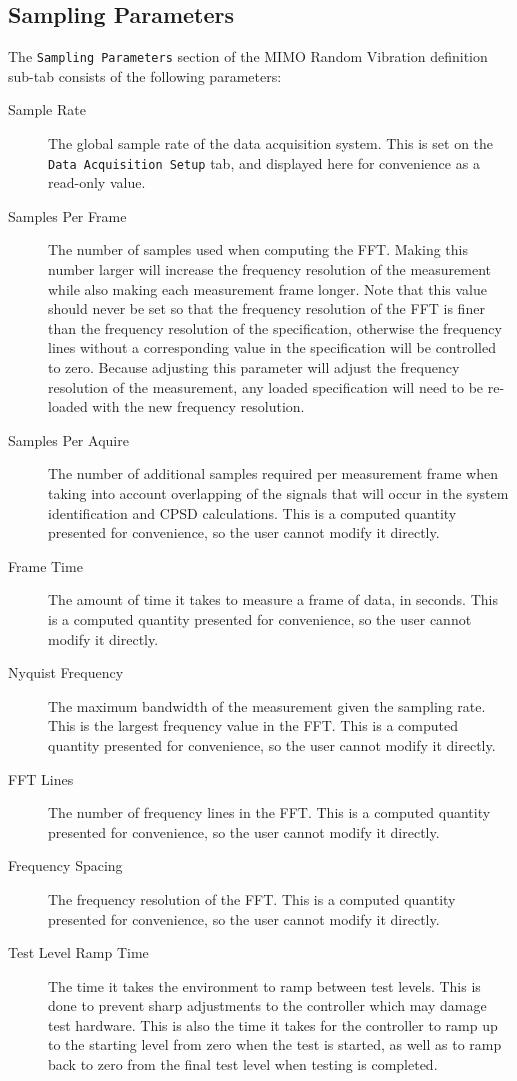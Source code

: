 \documentclass[pdf,12pt,report]{SANDreport}
\newcommand{\inlineCode}{\lstinline[basicstyle=\bfseries\ttfamily]}
\begin{document}
    \subsection{Sampling Parameters}
    The \inlineCode{Sampling Parameters} section of the \Ac{MIMO} Random Vibration definition sub-tab consists of the following parameters:
    \begin{description}
        \item[Sample Rate] The global sample rate of the data acquisition system.  This is set on the \inlineCode{Data Acquisition Setup} tab, and displayed here for convenience as a read-only value.
        \item[Samples Per Frame] The number of samples used when computing the \ac{FFT}.  Making this number larger will increase the frequency resolution of the measurement while also making each measurement frame longer.  Note that this value should never be set so that the frequency resolution of the \ac{FFT} is finer than the frequency resolution of the specification, otherwise the frequency lines without a corresponding value in the specification will be controlled to zero.  Because adjusting this parameter will adjust the frequency resolution of the measurement, any loaded specification will need to be re-loaded with the new frequency resolution.
        \item[Samples Per Aquire] The number of additional samples required per measurement frame when taking into account overlapping of the signals that will occur in the system identification and \ac{CPSD} calculations.  This is a computed quantity presented for convenience, so the user cannot modify it directly.
        \item[Frame Time] The amount of time it takes to measure a frame of data, in seconds.  This is a computed quantity presented for convenience, so the user cannot modify it directly.
        \item[Nyquist Frequency] The maximum bandwidth of the measurement given the sampling rate.  This is the largest frequency value in the \ac{FFT}.  This is a computed quantity presented for convenience, so the user cannot modify it directly.
        \item[FFT Lines] The number of frequency lines in the \ac{FFT}.  This is a computed quantity presented for convenience, so the user cannot modify it directly.
        \item[Frequency Spacing] The frequency resolution of the \ac{FFT}.  This is a computed quantity presented for convenience, so the user cannot modify it directly.
        \item[Test Level Ramp Time] The time it takes the environment to ramp between test levels.  This is done to prevent sharp adjustments to the controller which may damage test hardware.  This is also the time it takes for the controller to ramp up to the starting level from zero when the test is started, as well as to ramp back to zero from the final test level when testing is completed.
    \end{description}
\end{document}
